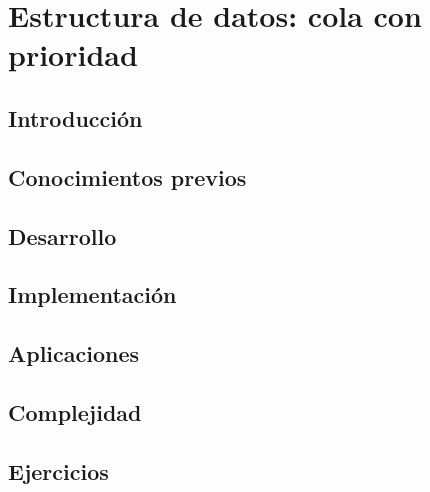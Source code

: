 \chapter{Estructura de datos: cola con prioridad }
\section{Introducción}

\section{Conocimientos previos}

\section{Desarrollo}

\section{Implementación}

\section{Aplicaciones}

\section{Complejidad}

\section{Ejercicios}
